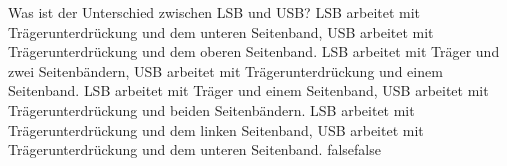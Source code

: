     {Was ist der Unterschied zwischen LSB und USB?}
    {LSB arbeitet mit Trägerunterdrückung und dem unteren Seitenband, USB arbeitet mit Trägerunterdrückung und dem oberen Seitenband.}
    {LSB arbeitet mit Träger und zwei Seitenbändern, USB arbeitet mit Trägerunterdrückung und einem Seitenband.}
    {LSB arbeitet mit Träger und einem Seitenband, USB arbeitet mit Trägerunterdrückung und beiden Seitenbändern.}
    {LSB arbeitet mit Trägerunterdrückung und dem linken Seitenband, USB arbeitet mit Trägerunterdrückung und dem unteren Seitenband.}
    {false}{false}